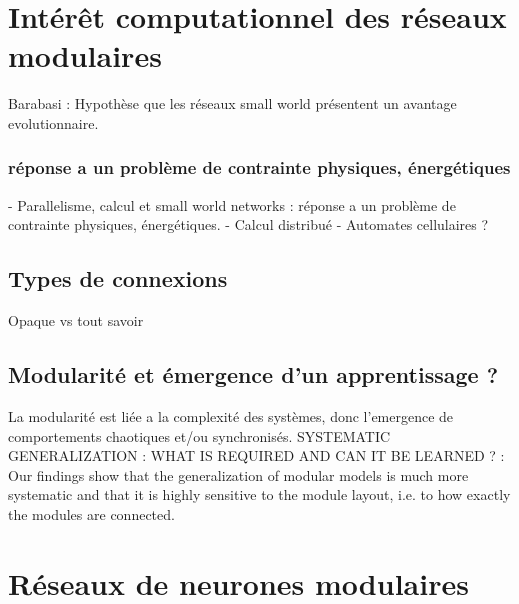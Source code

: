 
\section{Intérêt computationnel des réseaux modulaires}

Barabasi : Hypothèse que les réseaux small world présentent un avantage evolutionnaire.

\subsubsection{réponse a un problème de contrainte physiques, énergétiques}

- Parallelisme, calcul et small world networks : réponse a un problème de contrainte physiques, énergétiques. 
- Calcul distribué 
- Automates cellulaires  ?


\subsection{Types de connexions}

Opaque vs tout savoir


\subsection{Modularité et émergence d'un apprentissage ? }

La modularité est liée a la complexité des systèmes, donc l'emergence de comportements chaotiques et/ou synchronisés. 
SYSTEMATIC GENERALIZATION : WHAT IS REQUIRED
AND CAN IT BE LEARNED ? : 
Our findings show that the generalization of modular models is much more systematic and that it is highly sensitive to the module layout, i.e. to how exactly the modules are connected.


\section{Réseaux de neurones modulaires}

